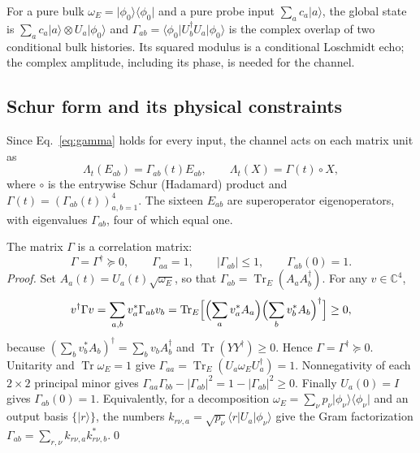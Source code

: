 \documentclass[11pt,a4paper]{article}
\newcommand{\ket}[1]{\lvert #1\rangle}
\newcommand{\bra}[1]{\langle #1\rvert}
\newcommand{\Tr}{\operatorname{Tr}}
\begin{document}
For a pure bulk $\omega_E=\ket{\phi_0}\bra{\phi_0}$ and a pure probe input
$\sum_ac_a\ket a$, the global state is
$\sum_ac_a\ket a\otimes U_a\ket{\phi_0}$ and
$\Gamma_{ab}=\bra{\phi_0}U_b^\dagger U_a\ket{\phi_0}$ is the complex overlap
of two conditional bulk histories. Its squared modulus is a conditional
Loschmidt echo; the complex amplitude, including its phase, is needed
for the channel.

\subsection{Schur form and its physical constraints}
\label{sec:schurconstraints}

Since Eq.~\eqref{eq:gamma} holds for every input, the channel acts on
each matrix unit as
\begin{equation}
 \boxed{\Lambda_t(E_{ab})=\Gamma_{ab}(t)E_{ab},\qquad
 \Lambda_t(X)=\Gamma(t)\circ X,}
 \label{eq:schur}
\end{equation}
where $\circ$ is the entrywise Schur (Hadamard) product and
$\Gamma(t)=(\Gamma_{ab}(t))_{a,b=1}^4$. The sixteen $E_{ab}$ are
superoperator eigenoperators, with eigenvalues $\Gamma_{ab}$, four of
which equal one.

The matrix $\Gamma$ is a correlation matrix:
\begin{equation}
 \Gamma=\Gamma^\dagger\succeq0,\qquad \Gamma_{aa}=1,
 \qquad |\Gamma_{ab}|\le1,\qquad \Gamma_{ab}(0)=1.
 \label{eq:correlation}
\end{equation}
\emph{Proof.} Set $A_a(t)=U_a(t)\sqrt{\omega_E}$, so that
$\Gamma_{ab}=\Tr_E(A_aA_b^\dagger)$. For any $v\in\mathbb C^4$,
\begin{equation}
 v^\dagger\Gamma v=\sum_{a,b}v_a^*\Gamma_{ab}v_b
 =\Tr_E\Bigl[\Bigl(\sum_av_a^*A_a\Bigr)\Bigl(\sum_bv_b^*A_b\Bigr)^\dagger\Bigr]\ge0,
\end{equation}
because $(\sum_bv_b^*A_b)^\dagger=\sum_bv_bA_b^\dagger$ and $\Tr(YY^\dagger)\ge0$.
Hence $\Gamma=\Gamma^\dagger\succeq0$. Unitarity and $\Tr\omega_E=1$
give $\Gamma_{aa}=\Tr_E(U_a\omega_EU_a^\dagger)=1$. Nonnegativity of each
$2\times2$ principal minor gives
$\Gamma_{aa}\Gamma_{bb}-|\Gamma_{ab}|^2=1-|\Gamma_{ab}|^2\ge0$.
Finally $U_a(0)=I$ gives $\Gamma_{ab}(0)=1$. Equivalently, for a
decomposition $\omega_E=\sum_\nu p_\nu\ket{\phi_\nu}\bra{\phi_\nu}$ and an
output basis $\{\ket r\}$, the numbers
$k_{r\nu,a}=\sqrt{p_\nu}\bra rU_a\ket{\phi_\nu}$ give the Gram
factorization $\Gamma_{ab}=\sum_{r,\nu}k_{r\nu,a}k_{r\nu,b}^*$.\qed
\end{document}
